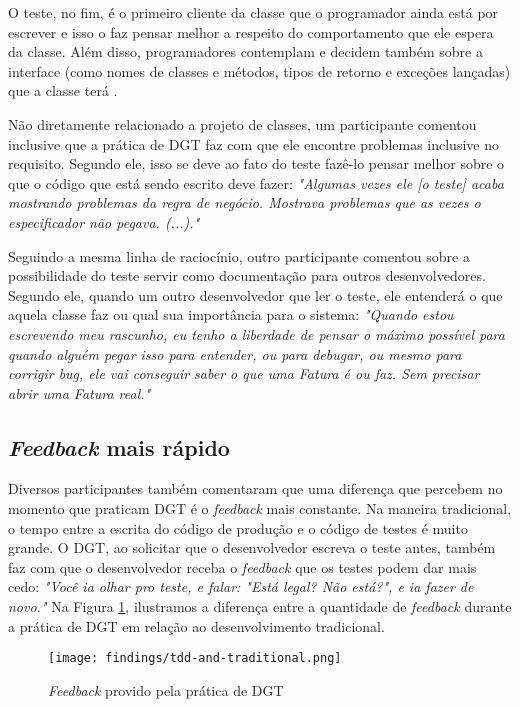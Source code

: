 O teste, no fim, é o primeiro cliente da classe que o programador ainda está por escrever e 
isso o faz pensar melhor a respeito do comportamento que ele espera da classe. Além disso,
programadores contemplam e decidem também sobre a interface (como nomes de
classes e métodos, tipos de retorno e exceções lançadas) que a classe terá
\cite{janzen-saiedian}.

Não diretamente relacionado a projeto de classes, um participante comentou inclusive
que a prática de DGT faz com que ele encontre problemas inclusive no requisito. Segundo ele,
isso se deve ao fato do teste fazê-lo pensar melhor sobre o que o código que está 
sendo escrito deve fazer:
\textit{"Algumas vezes ele [o teste] acaba mostrando problemas da regra de negócio. Mostrava problemas
que as vezes o especificador não pegava. (...)."}

Seguindo a mesma linha de raciocínio, outro participante comentou sobre a possibilidade
do teste servir como documentação para outros desenvolvedores. Segundo ele, quando um outro desenvolvedor
que ler o teste, ele entenderá o que aquela classe faz ou qual sua importância para o sistema:
\textit{"Quando estou escrevendo meu rascunho, eu tenho a liberdade de pensar o máximo possível para quando alguém
pegar isso para entender, ou para debugar, ou mesmo para corrigir bug, ele vai conseguir saber o que uma Fatura é ou faz. Sem
precisar abrir uma Fatura real."}

\subsection{\textit{Feedback} mais rápido}

Diversos participantes também comentaram que uma diferença que percebem
no momento que praticam DGT é o \textit{feedback} mais constante. Na maneira
tradicional, o tempo entre a escrita do código de produção e o código
de testes é muito grande. O DGT, ao solicitar que o desenvolvedor
escreva o teste antes, também faz com que o desenvolvedor receba o \textit{feedback} que
os testes podem dar mais cedo:
\textit{"Você ia olhar pro teste, e falar: "Está legal? Não está?", e ia fazer de novo."}
Na Figura \ref{fig:tdd-feedback}, ilustramos
a diferença entre a quantidade de \textit{feedback} durante a prática de DGT em relação
ao desenvolvimento tradicional.

\begin{figure}[h!H]
  \centering
  \texttt{[image: findings/tdd-and-traditional.png]}
  \caption{\textit{Feedback} provido pela prática de DGT}
  \label{fig:tdd-feedback}
\end{figure}

